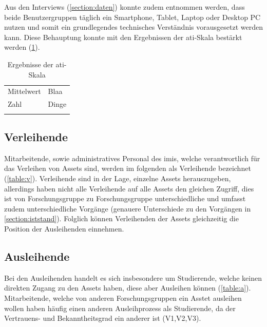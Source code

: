 Aus den Interviews (\ref{section:daten}) konnte zudem entnommen werden, dass beide Benutzergruppen täglich ein
Smartphone, Tablet, Laptop oder Desktop PC nutzen und somit ein grundlegendes technisches Verständnis
vorausgesetzt werden kann. Diese Behauptung konnte mit den Ergebnissen der \ac{ati}-Skala bestärkt
werden (\ref{table:ati}).

\begin{table}[h]
        \centering 
        \caption{Ergebnisse der \ac{ati}-Skala}
        \begin{tabular}{ll}
            \arrayrulecolor{maincolor}\hline
            \sffamily\color{maincolor}Mittelwert & \sffamily\color{maincolor}Blaa \\
            \arrayrulecolor{maincolor}\hline
                Zahl  & Dinge\\
            \arrayrulecolor{maincolor}\hline
        \end{tabular}
        \label{table:ati}
    \end{table}


\subsection*{Verleihende}
Mitarbeitende, sowie administratives Personal des \ac{imis}, welche verantwortlich für das Verleihen
von Assets sind, werden im folgenden als Verleihende bezeichnet (\ref{table:v}). Verleihende sind in
der Lage, einzelne Assets herauszugeben, allerdings haben nicht alle Verleihende auf alle Assets den
gleichen Zugriff, dies ist von Forschungsgruppe zu Forschungsgruppe unterschiedliche und umfasst
zudem unterschiedliche Vorgänge (genauere Unterschiede zu den Vorgängen in \ref{section:iststand}).
Folglich können Verleihenden der Assets gleichzeitig die Position der Ausleihenden einnehmen. 

\subsection*{Ausleihende} 
Bei den Ausleihenden handelt es sich insbesondere um Studierende, welche keinen direkten Zugang zu
den Assets haben, diese aber Ausleihen können (\ref{table:a}). Mitarbeitende, welche von anderen
Forschungsgruppen ein Asstet ausleihen wollen haben häufig einen anderen Ausleihprozess als
Studierende, da der Vertrauens- und Bekanntheitsgrad ein anderer ist (V1,V2,V3). 


